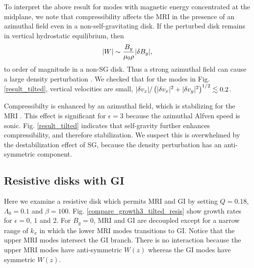 To interpret the above result for modes with magnetic energy
concentrated at the midplane, we note that compressibility affects the
MRI in the presence of an azimuthal field even in a
non-self-gravitating disk. If the perturbed disk remains in vertical
hydrostatic equilibrium, then  
\begin{align} 
  |W|\sim \frac{B_y}{\mu_0\rho}|\delta B_y|,
\end{align}
to order of magnitude in a non-SG disk. Thus a strong azimuthal field can 
cause a large density perturbation \citep{pessah05}. We checked that
for the modes in Fig. \ref{result_tilted}, vertical velocities are 
small, $|\delta v_z|/\left(|\delta v_x|^2+|\delta v_y|^2\right)^{1/2} \lesssim 0.2$. 

Compressibilty is enhanced by an azimuthal field, which is 
stabilizing for the MRI \citep{kim00}. %
This effect is significant for $\epsilon=3$ because the azimuthal
Alfven speed is sonic.      
Fig. \ref{result_tilted} indicates that self-gravity further enhances
compressibility, and therefore stabilization. We suspect this is
overwhelmed by the destabilization effect of SG, because the density
perturbation has an anti-symmetric component.      

\subsection{Resistive disks with GI}
Here we examine a resistive disk which permits MRI and GI by setting $Q=0.18$,
$\Lambda_0=0.1$ and $\beta=100$. 
Fig. \ref{compare_growth3_tilted_resis} show growth rates for
$\epsilon=0,\,1$ and $2$. For $B_y=0$, MRI and GI are decoupled except 
for a narrow range of $k_x$ in which the lower MRI modes transitions to
GI. Notice that the upper MRI modes intersect the GI branch. There is no
interaction because the upper MRI modes have anti-symmetric $W(z)$ whereas
the GI modes have symmetric $W(z)$. 

